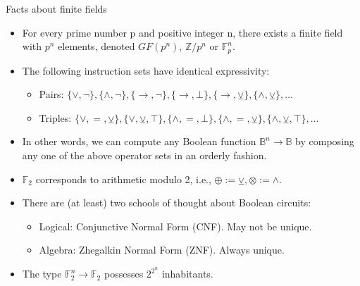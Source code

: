 \documentclass{beamer}
\begin{document}
    \begin{frame}{Facts about finite fields}
        \begin{itemize}
            \item For every prime number p and positive integer n, there exists a finite field with $p^n$ elements, denoted $GF(p^n)$, $\mathbb{Z}/p^n$ or $\mathbb{F}_p^n$.
            \item The following instruction sets have identical expressivity:
            \begin{itemize}
                \item Pairs: $\{\vee, \neg\}, \{\wedge, \neg\}, \{\to, \neg\}, \{\to, \bot\}, \{\to, \veebar\}, \{\land, \veebar\}, \ldots$
                \item Triples: $\{\lor, =, \veebar\}, \{\lor, \veebar, \top\}, \{\land, =, \bot\}, \{\land, =, \veebar\}, \{\land, \veebar, \top\}, \ldots$
            \end{itemize}
            \item In other words, we can compute any Boolean function $\mathbb{B}^n\rightarrow\mathbb{B}$ by composing any one of the above operator sets in an orderly fashion.
            \item $\mathbb{F}_2$ corresponds to arithmetic modulo 2, i.e., $\oplus := \veebar, \otimes := \land$.
            \item There are (at least) two schools of thought about Boolean circuits:
            \begin{itemize}
                \item Logical: Conjunctive Normal Form (CNF). May not be unique.
                \item Algebra: Zhegalkin Normal Form (ZNF). Always unique.
            \end{itemize}
            \item The type $\mathbb{F}_2^n\rightarrow\mathbb{F}_2$ possesses $2^{2^{n}}$ inhabitants.
        \end{itemize}
    \end{frame}
\end{document}
